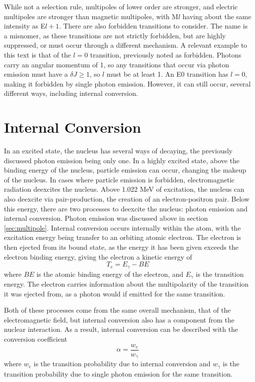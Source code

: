 While not a selection rule, multipoles of lower order are stronger, and electric multipoles are stronger than magnetic multipoles, with M$l$ having about the same intensity as E$l+1$. There are also forbidden transitions to consider. The name is a misnomer, as these transitions are not strictly forbidden, but are highly suppressed, or must occur through a different mechanism. A relevant example to this text is that of the $l=0$ transition, previously noted as forbidden. Photons carry an angular momentum of 1, so any transitions that occur via photon emission must have a $\delta J \geq 1$, so $l$ must be at least 1. An E0 transition has $l=0$, making it forbidden by single photon emission. However, it can still occur, several different ways, including internal conversion.

\section{Internal Conversion}

In an excited state, the nucleus has several ways of decaying, the previously discussed photon emission being only one. In a highly excited state, above the binding energy of the nucleus, particle emission can occur, changing the makeup of the nucleus. In cases where particle emission is forbidden, electromagnetic radiation deexcites the nucleus. Above 1.022 MeV of excitation, the nucleus can also deexcite via pair-production, the creation of an electron-positron pair. Below this energy, there are two processes to deexcite the nucleus: photon emission and internal conversion. Photon emission was discussed above in section \ref{sec:multipole}. Internal conversion occurs internally within the atom, with the excitation energy being transfer to an orbiting atomic electron. The electron is then ejected from its bound state, as the energy it has been given exceeds the electron binding energy, giving the electron a kinetic energy of 
\begin{equation}
    T_e = E_{\gamma}-BE
\end{equation} 
where $BE$ is the atomic binding energy of the electron, and $E_{\gamma}$ is the transition energy. The electron carries information about the multipolarity of the transition it was ejected from, as a photon would if emitted for the same transition.

Both of these processes come from the same overall mechanism, that of the electromagnetic field, but internal conversion also has a component from the nuclear interaction. As a result, internal conversion can be described with the conversion coefficient
\begin{equation}
\label{eq:conv_coeff}
    \alpha = \frac{w_e}{w_\gamma}
\end{equation}
where $w_e$ is the transition probability due to internal conversion and $w_\gamma$ is the transition probability due to single photon emission for the same transition.

